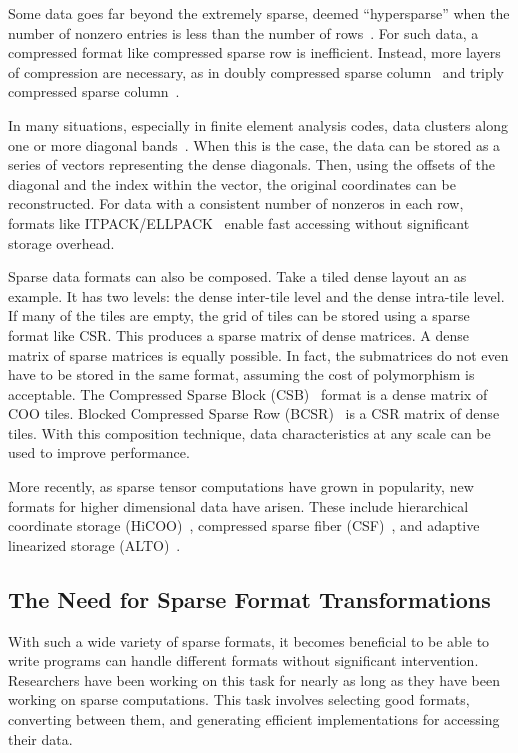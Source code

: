 Some data goes far beyond the extremely sparse, deemed ``hypersparse'' when the number of nonzero entries is less than the number of rows~\cite{buluc2008representation}.
For such data, a compressed format like compressed sparse row is inefficient. 
Instead, more layers of compression are necessary, as in doubly compressed sparse column~\cite{buluc2008representation} and triply compressed sparse column~\cite{mofrad2019efficient}.

In many situations, especially in finite element analysis codes, data clusters along one or more diagonal bands~\cite{berkley1999banded,grigoracs2016optimising}.
When this is the case, the data can be stored as a series of vectors representing the dense diagonals. 
Then, using the offsets of the diagonal and the index within the vector, the original coordinates can be reconstructed.
For data with a consistent number of nonzeros in each row, formats like ITPACK/ELLPACK~\cite{kincaid1982algorithm} enable fast accessing without significant storage overhead.

Sparse data formats can also be composed.
Take a tiled dense layout an as example.
It has two levels: the dense inter-tile level and the dense intra-tile level.
If many of the tiles are empty, the grid of tiles can be stored using a sparse format like CSR\@.
This produces a sparse matrix of dense matrices.
A dense matrix of sparse matrices is equally possible.
In fact, the submatrices do not even have to be stored in the same format, assuming the cost of polymorphism is acceptable.
The Compressed Sparse Block (CSB)~\cite{buluc2009parallel} format is a dense matrix of COO tiles.
Blocked Compressed Sparse Row (BCSR)~\cite{im2004sparsity} is a CSR matrix of dense tiles.
With this composition technique, data characteristics at any scale can be used to improve performance.

More recently, as sparse tensor computations have grown in popularity, new formats for higher dimensional data have arisen.
These include hierarchical coordinate storage (HiCOO)~\cite{li2018hicoo}, compressed sparse fiber (CSF)~\cite{smith2015splatt}, and adaptive linearized storage (ALTO)~\cite{helal2021alto}.

\subsection{The Need for Sparse Format Transformations}

With such a wide variety of sparse formats, it becomes beneficial to be able to write programs can handle different formats without significant intervention.
Researchers have been working on this task for nearly as long as they have been working on sparse computations.
This task involves selecting good formats, converting between them, and generating efficient implementations for accessing their data.


